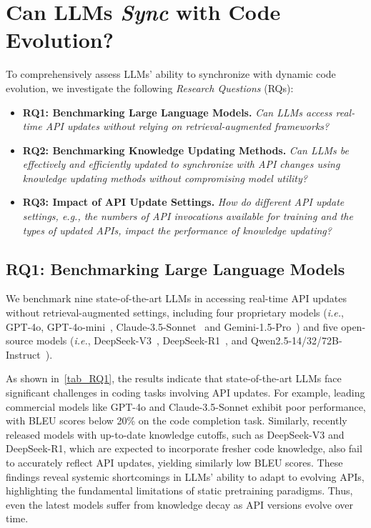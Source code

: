 \section{Can LLMs \textit{Sync} with Code Evolution?}
To comprehensively assess LLMs' ability to synchronize with dynamic code evolution, we investigate the following \textit{Research Questions} (RQs):
\begin{itemize}[leftmargin=4mm, itemsep=0.05mm]
    \item \textbf{RQ1: Benchmarking Large Language Models.}
        \textit{Can LLMs access real-time API updates without relying on retrieval-augmented frameworks?}
    \item \textbf{RQ2: Benchmarking Knowledge Updating Methods.} 
        \textit{Can LLMs be effectively and efficiently updated to synchronize with API changes using knowledge updating methods without compromising model utility?}
    \item \textbf{RQ3: Impact of API Update Settings.} 
        \textit{How do different API update settings, \emph{e.g.}, the numbers of API invocations available for training and the types of updated APIs, impact the performance of knowledge updating?} 
\end{itemize}

\subsection{RQ1: Benchmarking Large Language Models}
We benchmark nine state-of-the-art LLMs in accessing real-time API updates without retrieval-augmented settings, including four proprietary models (\emph{i.e.}, GPT-4o, GPT-4o-mini~\cite{openai2024gpt4o}, Claude-3.5-Sonnet~\cite{anthropic2024claude} and Gemini-1.5-Pro~\cite{geminiteam2024geminifamilyhighlycapable}) and five open-source models (\emph{i.e.}, DeepSeek-V3~\cite{liu2024deepseekv3}, DeepSeek-R1~\cite{guo2025deepseekr1}, and Qwen2.5-14/32/72B-Instruct~\cite{qwen2.5}).

As shown in~\autoref{tab_RQ1}, the results indicate that state-of-the-art LLMs face significant challenges in coding tasks involving API updates. For example, leading commercial models like GPT-4o and Claude-3.5-Sonnet exhibit poor performance, with BLEU scores below 20\% on the code completion task. Similarly, recently released models with up-to-date knowledge cutoffs, such as DeepSeek-V3 and DeepSeek-R1, which are expected to incorporate fresher code knowledge, also fail to accurately reflect API updates, yielding similarly low BLEU scores. These findings reveal systemic shortcomings in LLMs' ability to adapt to evolving APIs, highlighting the fundamental limitations of static pretraining paradigms. Thus, even the latest models suffer from knowledge decay as API versions evolve over time.

